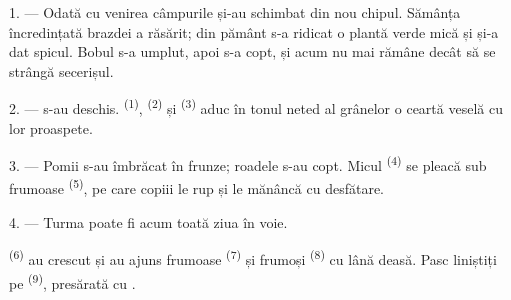 %
%


\VUsaut{5.0mm}
\VUsaut{3.0mm}
\VUsaut{3.0mm}
\VUsaut{4.0mm}
\VUsaut{3.0mm}

1. --- Odată cu venirea  câmpurile și-au schimbat din nou chipul.
Sămânța încredințată brazdei a răsărit; din pământ s-a ridicat o plantă verde mică
și și-a dat spicul. Bobul s-a umplut, apoi s-a copt, și acum nu mai rămâne decât
să se strângă secerișul.

2. ---  s-au deschis. 
\textsuperscript{(1)},  \textsuperscript{(2)} și
 \textsuperscript{(3)} aduc în tonul neted al grânelor o ceartă
veselă cu  lor proaspete.

3. --- Pomii s-au îmbrăcat în frunze; roadele s-au copt. Micul 
\textsuperscript{(4)} se pleacă sub  frumoase \textsuperscript{(5)},
pe care copiii le rup și le mănâncă cu desfătare.

4. --- Turma poate fi acum toată ziua în voie.

 \textsuperscript{(6)} au crescut și au ajuns 
frumoase \textsuperscript{(7)} și  frumoși \textsuperscript{(8)}
cu lână deasă. Pasc liniștiți  pe 
\textsuperscript{(9)}, presărată cu .

